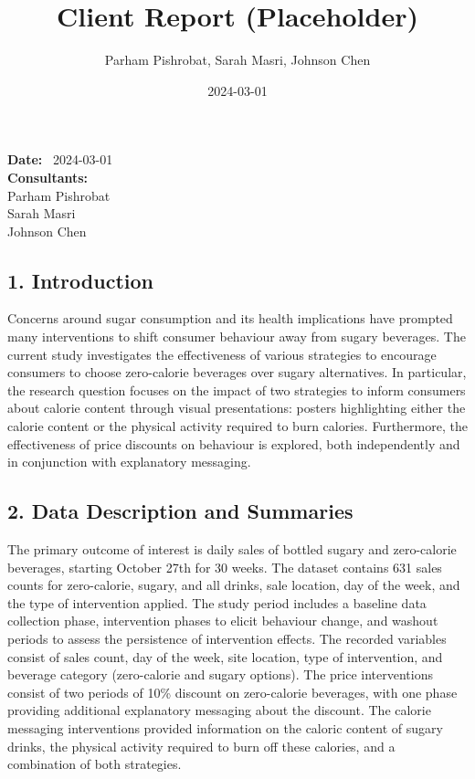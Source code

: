 \documentclass[
]{article}
\title{Client Report (Placeholder)}
\author{Parham Pishrobat, Sarah Masri, Johnson Chen}
\date{2024-03-01}
\begin{document}
\maketitle

\textbf{Date:} \quad \  2024-03-01\\  
\textbf{Consultants:} \\
Parham Pishrobat\\
Sarah Masri\\
Johnson Chen\\  

\pagebreak

\hypertarget{introduction}{%
\subsection{1. Introduction}\label{introduction}}

Concerns around sugar consumption and its health implications have
prompted many interventions to shift consumer behaviour away from sugary
beverages. The current study investigates the effectiveness of various
strategies to encourage consumers to choose zero-calorie beverages over
sugary alternatives. In particular, the research question focuses on the
impact of two strategies to inform consumers about calorie content
through visual presentations: posters highlighting either the calorie
content or the physical activity required to burn calories. Furthermore,
the effectiveness of price discounts on behaviour is explored, both
independently and in conjunction with explanatory messaging.

\hypertarget{data-description-and-summaries}{%
\subsection{2. Data Description and
Summaries}\label{data-description-and-summaries}}

The primary outcome of interest is daily sales of bottled sugary and
zero-calorie beverages, starting October 27th for 30 weeks. The dataset
contains 631 sales counts for zero-calorie, sugary, and all drinks, sale
location, day of the week, and the type of intervention applied. The
study period includes a baseline data collection phase, intervention
phases to elicit behaviour change, and washout periods to assess the
persistence of intervention effects. The recorded variables consist of
sales count, day of the week, site location, type of intervention, and
beverage category (zero-calorie and sugary options). The price
interventions consist of two periods of 10\% discount on zero-calorie
beverages, with one phase providing additional explanatory messaging
about the discount. The calorie messaging interventions provided
information on the caloric content of sugary drinks, the physical
activity required to burn off these calories, and a combination of both
strategies.
\end{document}
